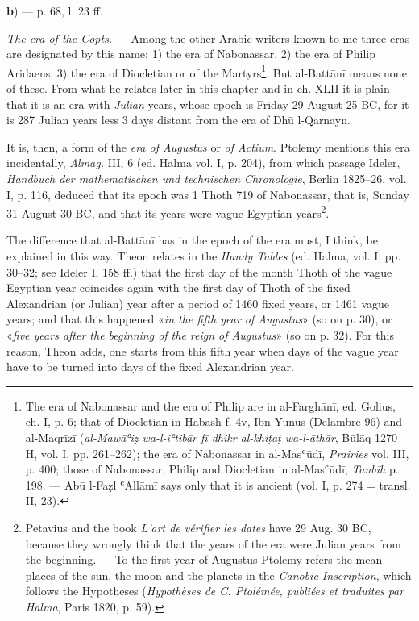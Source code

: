 \documentclass[11pt]{article}
\newcommand{\Pg}[1]{\marginpar{\footnotesize\color{gray}#1}}
\begin{document}
\addtocounter{footnote}{-2}
\par\begin{center}\Pg{I 244}\textbf{b}) — p. 68, l. 23 ff.\end{center}
\par \emph{The era of the Copts.} — Among the other Arabic writers known to me three eras are designated by this name: 1) the era of Nabonassar, 2) the era of Philip Aridaeus, 3) the era of Diocletian or of the Martyrs\footnote{The era of Nabonassar and the era of Philip are in al-Farghānī, ed. Golius, ch. I, p. 6; that of Diocletian in Ḥabash f. 4v, Ibn Yūnus (Delambre 96) and al-Maqrīzī (\emph{al-Mawāʿiẓ wa-l-iʿtibār fī dhikr al-khiṭaṭ wa-l-āthār}, Būlāq 1270 H, vol. I, pp. 261–262); the era of Nabonassar in al-Masʿūdī, \emph{Prairies} vol. III, p. 400; those of Nabonassar, Philip and Diocletian in al-Masʿūdī, \emph{Tanbīh} p. 198. — Abū l-Faẓl ʿAllāmī says only that it is ancient (vol. I, p. 274 = transl. II, 23).}. But al-Battānī means none of these. From what he relates later in this chapter and in ch. XLII it is plain that it is an era with \emph{Julian} years, whose epoch is Friday 29 August 25 BC, for it is 287 Julian years less 3 days distant from the era of Dhū l-Qarnayn.\par
\par It is, then, a form of the \emph{era of Augustus} or \emph{of Actium}. Ptolemy mentions this era incidentally, \emph{Almag.} III, 6 (ed. Halma vol. I, p. 204), from which passage Ideler, \emph{Handbuch der mathematischen und technischen Chronologie}, Berlin 1825–26, vol. I, p. 116, deduced that its epoch was 1 Thoth 719 of Nabonassar, that is, Sunday 31 August 30 BC, and that its years were vague Egyptian years\footnote{Petavius and the book \emph{L’art de vérifier les dates} have 29 Aug. 30 BC, because they wrongly think that the years of the era were Julian years from the beginning. — To the first year of Augustus Ptolemy refers the mean places of the sun, the moon and the planets in the \emph{Canobic Inscription}, which follows the Hypotheses (\emph{Hypothèses de C. Ptolémée, publiées et traduites par Halma}, Paris 1820, p. 59).}.\par
\par The difference that al-Battānī has in the epoch of the era must, I think, be explained in this way. Theon relates in the \emph{Handy Tables} (ed. Halma, vol. I, pp. 30–32; see Ideler I, 158 ff.) that the first day of the month Thoth of the vague Egyptian year coincides again with the first day of Thoth of the fixed Alexandrian (or Julian) year after a period of 1460 fixed years, or 1461 vague years; and that this happened «\emph{in the fifth year of Augustus}» (so on p. 30), or «\emph{five years after the beginning of the reign of Augustus}» (so on p. 32). For this reason, Theon adds, one starts from this fifth year when days of the vague year have to be turned into days of the fixed Alexandrian year.\par
\end{document}
